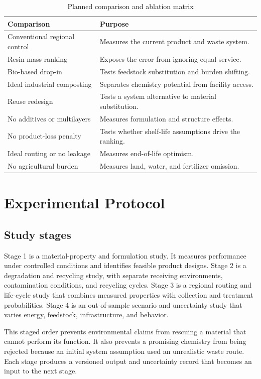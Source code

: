 \documentclass[conference]{IEEEtran}
\begin{document}
\begin{table}[t]
\caption{Planned comparison and ablation matrix}
\label{tab:comparison}
\centering
\footnotesize
\setlength{\tabcolsep}{3pt}
\begin{tabular}{p{}p{}}
\toprule
Comparison & Purpose\\
\midrule
Conventional regional control & Measures the current product and waste system.\\
Resin-mass ranking & Exposes the error from ignoring equal service.\\
Bio-based drop-in & Tests feedstock substitution and burden shifting.\\
Ideal industrial composting & Separates chemistry potential from facility access.\\
Reuse redesign & Tests a system alternative to material substitution.\\
No additives or multilayers & Measures formulation and structure effects.\\
No product-loss penalty & Tests whether shelf-life assumptions drive the ranking.\\
Ideal routing or no leakage & Measures end-of-life optimism.\\
No agricultural burden & Measures land, water, and fertilizer omission.\\
\bottomrule
\end{tabular}
\end{table}

\section{Experimental Protocol}

\subsection{Study stages}

Stage 1 is a material-property and formulation study. It measures performance under controlled conditions and identifies feasible product designs. Stage 2 is a degradation and recycling study, with separate receiving environments, contamination conditions, and recycling cycles. Stage 3 is a regional routing and life-cycle study that combines measured properties with collection and treatment probabilities. Stage 4 is an out-of-sample scenario and uncertainty study that varies energy, feedstock, infrastructure, and behavior.

This staged order prevents environmental claims from rescuing a material that cannot perform its function. It also prevents a promising chemistry from being rejected because an initial system assumption used an unrealistic waste route. Each stage produces a versioned output and uncertainty record that becomes an input to the next stage.
\end{document}
